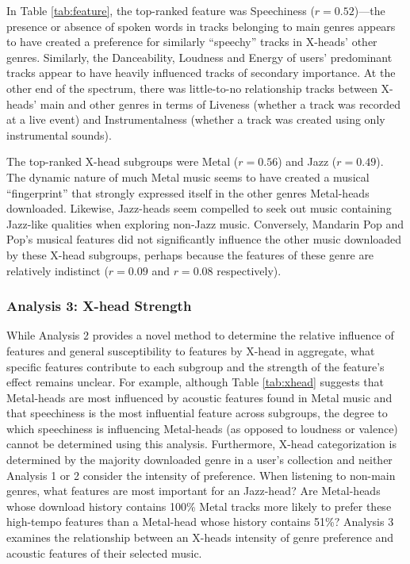\documentclass[a4paper]{article}
\begin{document}
In Table \ref{tab:feature}, the top-ranked feature was Speechiness ($r=0.52$)—the presence or absence of spoken words in tracks belonging to main genres appears to have created a preference for similarly “speechy” tracks in X-heads’ other genres. Similarly, the Danceability, Loudness and Energy of users' predominant tracks appear to have heavily influenced tracks of secondary importance. At the other end of the spectrum, there was little-to-no relationship tracks between X-heads’ main and other genres in terms of Liveness (whether a track was recorded at a live event) and Instrumentalness (whether a track was created using only instrumental sounds). 

The top-ranked X-head subgroups were Metal ($r=0.56$) and Jazz ($r=0.49$). The dynamic nature of much Metal music seems to have created a musical “fingerprint” that strongly expressed itself in the other genres Metal-heads downloaded. Likewise, Jazz-heads seem compelled to seek out music containing Jazz-like qualities when exploring non-Jazz music. Conversely, Mandarin Pop and Pop’s musical features did not significantly influence the other music downloaded by these X-head subgroups, perhaps because the features of these genre are relatively indistinct ($r=0.09$ and $r=0.08$ respectively).

\subsubsection{Analysis 3: X-head Strength}\label{sec:leaky_anal_3}
While Analysis 2 provides a novel method to determine the relative influence of features and general susceptibility to features by X-head in aggregate, what specific features contribute to each subgroup and the strength of the feature's effect remains unclear. For example, although Table \ref{tab:xhead} suggests that Metal-heads are most influenced by acoustic features found in Metal music and that speechiness is the most influential feature across subgroups, the degree to which speechiness is influencing Metal-heads (as opposed to loudness or valence) cannot be determined using this analysis. Furthermore, X-head categorization is determined by the majority downloaded genre in a user's collection and neither Analysis 1 or 2 consider the intensity of preference. When listening to non-main genres, what features are most important for an Jazz-head? Are Metal-heads whose download history contains 100\% Metal tracks more likely to prefer these high-tempo features than a Metal-head whose history contains 51\%? Analysis 3 examines the relationship between an X-heads intensity of genre preference and acoustic features of their selected music.
\end{document}
